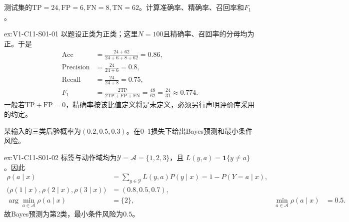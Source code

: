 \begin{SLChapterExercisePairSection}

\begin{exercise}\label{ex:V1-C11-S01-01}
测试集的$\mathrm{TP}=24,\mathrm{FP}=6,\mathrm{FN}=8,\mathrm{TN}=62$。计算准确率、精确率、召回率和$F_1$。
\end{exercise}
\label{sol:V1-C11-S01-01}
\begin{chapterexercisesolution}{ex:V1-C11-S01-01}
以题设正类为正类；这里$N=100$且精确率、召回率的分母均为正。于是
\[
\begin{aligned}
\mathrm{Acc}
  &=\frac{24+62}{24+6+8+62}=0.86,\\
\mathrm{Precision}
  &=\frac{24}{24+6}=0.8,\\
\mathrm{Recall}
  &=\frac{24}{24+8}=0.75,\\
F_1
  &=\frac{2\mathrm{TP}}{2\mathrm{TP}+\mathrm{FP}+\mathrm{FN}}
    =\frac{48}{62}=\frac{24}{31}\approx0.774.
\end{aligned}
\]
一般若$\mathrm{TP}+\mathrm{FP}=0$，精确率按该比值定义将是未定义，必须另行声明评价库采用的约定。
\end{chapterexercisesolution}

\begin{exercise}\label{ex:V1-C11-S01-02}
某输入的三类后验概率为$(0.2,0.5,0.3)$。在0--1损失下给出Bayes预测和最小条件风险。
\end{exercise}
\label{sol:V1-C11-S01-02}
\begin{chapterexercisesolution}{ex:V1-C11-S01-02}
标签与动作域均为$\mathcal Y=\mathcal A=\{1,2,3\}$，且
$L(y,a)=\mathbf1\{y\ne a\}$。因此
\[
\begin{aligned}
\rho(a\mid x)
  &=\sum_{y\in\mathcal Y}L(y,a)P(y\mid x)
    =1-P(Y=a\mid x),\\
\bigl(\rho(1\mid x),\rho(2\mid x),\rho(3\mid x)\bigr)
  &=(0.8,0.5,0.7),\\
\arg\min_{a\in\mathcal A}\rho(a\mid x)&=\{2\},&
\min_{a\in\mathcal A}\rho(a\mid x)&=0.5.
\end{aligned}
\]
故Bayes预测为第$2$类，最小条件风险为$0.5$。
\end{chapterexercisesolution}


\end{SLChapterExercisePairSection}
